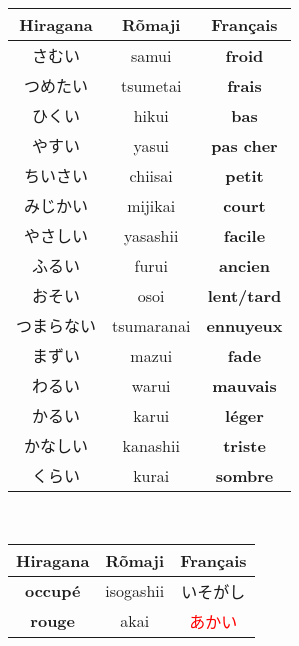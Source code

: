 \documentclass[11pt]{report}
\newenvironment{Japanese}{%
\CJKfamily{min}%
\CJKtilde  
\CJKnospace}{}
\begin{document}
\begin{CJK}{UTF8}{}
\begin{Japanese}
\begin{center}
\begin{multicols}{2}
\begin{tabular}{|c|c|c|}
			\end{tabular}
			\begin{tabular}{|c|c|c|}
				\hline
				\textbf{Hiragana} & \textbf{Rõmaji} & \textbf{Français} \\
				\hline
				さむい & samui & \textbf{froid} \\%
				\hline
				つめたい & tsumetai & \textbf{frais} \\%
				\hline
				ひくい & hikui & \textbf{bas} \\%
				\hline
				やすい & yasui & \textbf{pas cher} \\%
				\hline
				ちいさい & chiisai & \textbf{petit} \\%
				\hline
				みじかい & mijikai & \textbf{court} \\%
				\hline
				やさしい & yasashii & \textbf{facile} \\%
				\hline
				ふるい & furui & \textbf{ancien} \\%
				\hline
				おそい & osoi & \textbf{lent/tard} \\%
				\hline
				つまらない & tsumaranai & \textbf{ennuyeux} \\%
				\hline
				まずい & mazui & \textbf{fade} \\%
				\hline
				わるい & warui & \textbf{mauvais} \\%
				\hline
				かるい & karui & \textbf{léger} \\%
				\hline
				かなしい & kanashii & \textbf{triste} \\%
				\hline
				くらい & kurai & \textbf{sombre} \\%
				\hline
			\end{tabular}
		\end{multicols}
		~\\
		\begin{tabular}{|c|c|c|}
			\hline
			\textbf{Hiragana} & \textbf{Rõmaji} & \textbf{Français} \\
			\hline
			\textbf{occupé} & isogashii & いそがし \\
			\hline
			\textbf{rouge} & akai & \textcolor{red}{あかい} \\

\end{tabular}
\end{center}
\end{Japanese}
\end{CJK}
\end{document}
